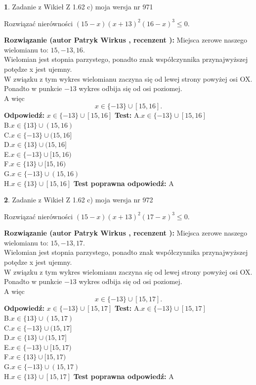\documentclass[12pt, a4paper]{article}
\theoremstyle{definition} %
\newtheorem{zad}{}
\newcommand{\zadStart}[1]{\begin{zad}#1\newline}
\newcommand{\zadStop}{\end{zad}}
\newcommand{\rozwStart}[2]{\noindent \textbf{Rozwiązanie (autor #1 , recenzent #2): }\newline}
\newcommand{\rozwStop}{\newline}
\newcommand{\odpStart}{\noindent \textbf{Odpowiedź:}\newline}
\newcommand{\odpStop}{\newline}
\newcommand{\testStart}{\noindent \textbf{Test:}\newline}
\newcommand{\testStop}{\newline}
\newcommand{\kluczStart}{\noindent \textbf{Test poprawna odpowiedź:}\newline}
\newcommand{\kluczStop}{\newline}
\begin{document}
\zadStart{Zadanie z Wikieł Z 1.62 c) moja wersja nr 971}

Rozwiązać nierówności $(15-x)(x+13)^{2}(16-x)^{3}\le0$.
\zadStop
\rozwStart{Patryk Wirkus}{}
Miejsca zerowe naszego wielomianu to: $15, -13, 16$.\\
Wielomian jest stopnia parzystego, ponadto znak współczynnika przy\linebreak najwyższej potędze x jest ujemny.\\ W związku z tym wykres wielomianu zaczyna się od lewej strony powyżej osi OX.\\
Ponadto w punkcie $-13$ wykres odbija się od osi poziomej.\\
A więc $$x \in \{-13\} \cup [15,16].$$
\rozwStop
\odpStart
$x \in \{-13\} \cup [15,16]$
\odpStop
\testStart
A.$x \in \{-13\} \cup [15,16]$\\
B.$x \in \{13\} \cup (15,16)$\\
C.$x \in \{-13\} \cup (15,16]$\\
D.$x \in \{13\} \cup (15,16]$\\
E.$x \in \{-13\} \cup [15,16)$\\
F.$x \in \{13\} \cup [15,16)$\\
G.$x \in \{-13\} \cup (15,16)$\\
H.$x \in \{13\} \cup [15,16]$
\testStop
\kluczStart
A
\kluczStop



\zadStart{Zadanie z Wikieł Z 1.62 c) moja wersja nr 972}

Rozwiązać nierówności $(15-x)(x+13)^{2}(17-x)^{3}\le0$.
\zadStop
\rozwStart{Patryk Wirkus}{}
Miejsca zerowe naszego wielomianu to: $15, -13, 17$.\\
Wielomian jest stopnia parzystego, ponadto znak współczynnika przy\linebreak najwyższej potędze x jest ujemny.\\ W związku z tym wykres wielomianu zaczyna się od lewej strony powyżej osi OX.\\
Ponadto w punkcie $-13$ wykres odbija się od osi poziomej.\\
A więc $$x \in \{-13\} \cup [15,17].$$
\rozwStop
\odpStart
$x \in \{-13\} \cup [15,17]$
\odpStop
\testStart
A.$x \in \{-13\} \cup [15,17]$\\
B.$x \in \{13\} \cup (15,17)$\\
C.$x \in \{-13\} \cup (15,17]$\\
D.$x \in \{13\} \cup (15,17]$\\
E.$x \in \{-13\} \cup [15,17)$\\
F.$x \in \{13\} \cup [15,17)$\\
G.$x \in \{-13\} \cup (15,17)$\\
H.$x \in \{13\} \cup [15,17]$
\testStop
\kluczStart
A
\kluczStop
\end{document}
